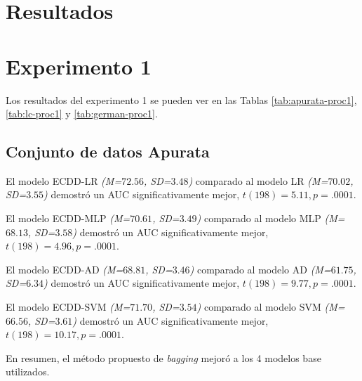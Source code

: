 \section{Resultados}

\section{Experimento 1} %

Los resultados del experimento 1 se pueden ver en las Tablas \ref{tab:apurata-proc1}, \ref{tab:lc-proc1} y \ref{tab:german-proc1}.


\subsection{Conjunto de datos Apurata}

El modelo ECDD-LR \textit{(M=$72.56$, SD=$3.48$)} comparado al modelo \ac{LR} \textit{(M=$70.02$, SD=$3.55$)} demostró un \ac{AUC} significativamente mejor, $t(198)=5.11, p=.0001$.

El modelo ECDD-MLP \textit{(M=$70.61$, SD=$3.49$)} comparado al modelo \ac{MLP} \textit{(M=$68.13$, SD=$3.58$)} demostró un \ac{AUC} significativamente mejor, $t(198)=4.96, p=.0001$.

El modelo ECDD-AD \textit{(M=$68.81$, SD=$3.46$)} comparado al modelo \ac{AD} \textit{(M=$61.75$, SD=$6.34$)} demostró un \ac{AUC} significativamente mejor, $t(198)=9.77, p=.0001$.

El modelo ECDD-SVM \textit{(M=$71.70$, SD=$3.54$)} comparado al modelo \ac{SVM} \textit{(M=$66.56$, SD=$3.61$)} demostró un \ac{AUC} significativamente mejor, $t(198)=10.17, p=.0001$.

En resumen, el método propuesto de \textit{bagging} mejoró a los 4 modelos base utilizados.

